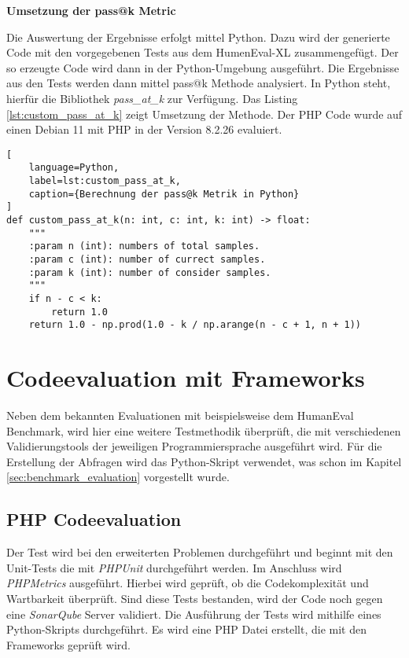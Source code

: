 \textbf{Umsetzung der pass@k Metric}\vspace{0.2cm}

Die Auswertung der Ergebnisse erfolgt mittel Python. Dazu wird der generierte Code mit den vorgegebenen Tests aus dem HumenEval-XL zusammengefügt. Der so erzeugte Code wird dann in der Python-Umgebung ausgeführt. Die Ergebnisse aus den Tests werden dann mittel pass@k Methode analysiert. In Python steht, hierfür die Bibliothek \textit{pass\_at\_k} zur Verfügung. Das Listing \ref{lst:custom_pass_at_k} zeigt Umsetzung der Methode. Der PHP Code wurde auf einen Debian 11 mit PHP in der Version 8.2.26 evaluiert.

\begin{lstlisting}[
	language=Python,
	label=lst:custom_pass_at_k,
	caption={Berechnung der pass@k Metrik in Python}
]
def custom_pass_at_k(n: int, c: int, k: int) -> float:
    """
    :param n (int): numbers of total samples.
    :param c (int): number of currect samples.
    :param k (int): number of consider samples.
    """
    if n - c < k:
        return 1.0
    return 1.0 - np.prod(1.0 - k / np.arange(n - c + 1, n + 1))
\end{lstlisting}


\section{Codeevaluation mit Frameworks}
Neben dem bekannten Evaluationen mit beispielsweise dem HumanEval Benchmark, wird hier eine weitere Testmethodik überprüft, die mit verschiedenen Validierungstools der jeweiligen Programmiersprache ausgeführt wird. Für die Erstellung der Abfragen wird das Python-Skript verwendet, was schon im Kapitel \ref{sec:benchmark_evaluation} vorgestellt wurde.

\subsection{PHP Codeevaluation}
Der Test wird bei den erweiterten Problemen durchgeführt und beginnt mit den Unit-Tests die mit \textit{PHPUnit} durchgeführt werden. Im Anschluss wird \textit{PHPMetrics} ausgeführt. Hierbei wird geprüft, ob die Codekomplexität und Wartbarkeit überprüft. Sind diese Tests bestanden, wird der Code noch gegen eine \textit{SonarQube} Server validiert. Die Ausführung der Tests wird mithilfe eines Python-Skripts durchgeführt. Es wird eine PHP Datei erstellt, die mit den Frameworks geprüft wird.


